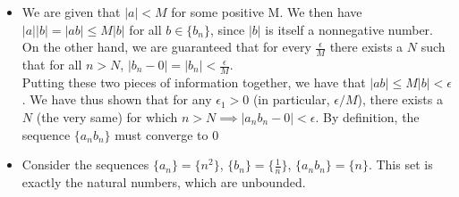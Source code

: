 \documentclass[11 pt]{article}
\begin{document}
\begin{solution}
	\begin{itemize}
		\item We are given that $|a|<M$ for some positive M.
		We then have $|a||b|=|ab|\leq M|b|$ for all  $b\in\{b_n\}$, since $|b|$ is itself a nonnegative number.\\
		On the other hand, we are guaranteed that for every $\frac{\epsilon}{M}$ there exists a $N$ such that for all $n>N$, $|b_n-0|=|b_n|<\frac{\epsilon}{M}$.\\
		Putting these two pieces of information together, we have that $|ab|\leq M|b|<\epsilon$.
		We have thus shown that for any  $\epsilon_1 >0$ (in particular, $\epsilon/M$), there exists a $N$ (the very same) for which $n>N\implies|a_nb_n-0|<\epsilon$.
		By definition, the sequence $\{a_nb_n\}$ must converge to 0
		\item Consider the sequences $\{a_n\}=\{n^2\}$, $\{b_n\}=\{\frac{1}{n}\}$, $\{a_nb_n\}=\{n\}$. This set is exactly the natural numbers, which are unbounded.
	\end{itemize}
\end{solution}
\end{document}
